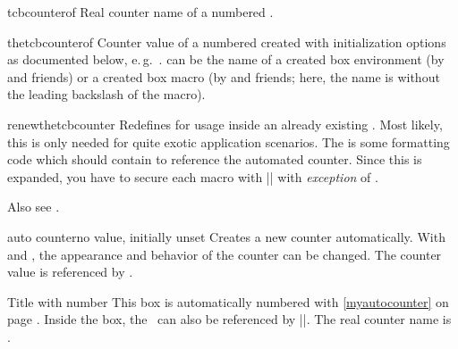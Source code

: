 \begin{docCommand}[doc new=2025-07-21]{tcbcounterof}{}
Real counter name of a numbered .
\end{docCommand}

\begin{docCommand}[doc new=2025-07-21]{thetcbcounterof}{}
Counter value of a numbered  created with
initialization options as documented below, e.\,g.\ .
 can be the name of a created box environment (by  and friends)
or a created box macro (by  and friends; here, the name is
without the leading backslash of the macro).
\end{docCommand}

\begin{docCommand}[doc new=2026-03-05]{renewthetcbcounter}{}
Redefines  for usage inside an already existing .
Most likely, this is only needed for quite exotic application scenarios.
The  is some formatting code which should contain  to
reference the automated counter. Since this  is expanded, you have
to secure each macro with |\noexpand| with \emph{exception} of .

\begin{dispListing}
\end{dispListing}

Also see .
\end{docCommand}


\clearpage
\begin{newTcbKey}{auto counter}{}{no value, initially unset}
Creates a new counter automatically.
With  and
, the appearance and behavior of the counter
can be changed. The counter value is referenced by .


\begin{dispExample}
\begin{pabox}[label={myautocounter}]{Title with number}
This box is automatically numbered with \ref{myautocounter} on page
\pageref{myautocounter}. Inside the box, the \thetcbcounter\ can
also be referenced by |\thetcbcounter|.
The real counter name is \texttt{\tcbcounter}.
\end{pabox}
\end{dispExample}
\end{newTcbKey}


